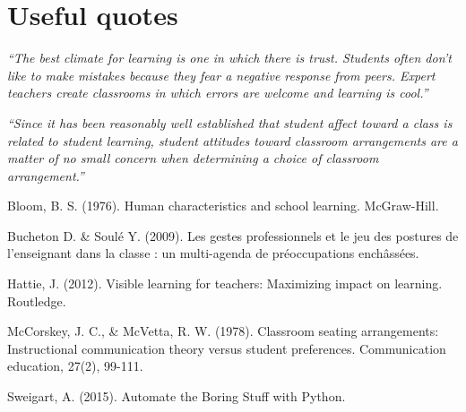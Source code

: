\documentclass[10pt]{article}
\begin{document}
 \section{Useful quotes}
 
\begin{center} 
\emph{``The best climate for learning is one in which there is trust. Students often don’t like to make mistakes because they fear a negative response from peers. Expert teachers create classrooms in which errors are welcome and learning is cool.''} \cite{Hat12}
\end{center}
 
\begin{center} 
\emph{``Since it has been reasonably well established that student affect toward a class is related to student learning, student attitudes toward classroom arrangements are a matter of no small concern when determining a choice of classroom arrangement.''} \cite{MM78}
\end{center}

\begin{thebibliography}{2}

 Bloom, B. S. (1976). Human characteristics and school learning. McGraw-Hill.

 Bucheton D. \& Soulé Y. (2009). Les gestes professionnels et le jeu des postures de l’enseignant dans la classe : un multi-agenda de préoccupations enchâssées.

 Hattie, J. (2012). Visible learning for teachers: Maximizing impact on learning. Routledge.

 McCorskey, J. C., \& McVetta, R. W. (1978). Classroom seating arrangements: Instructional communication theory versus student preferences. Communication education, 27(2), 99-111.

 Sweigart, A. (2015). Automate the Boring Stuff with Python.
\end{thebibliography}
\end{document}
